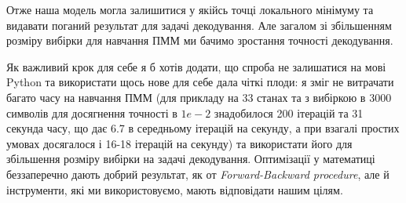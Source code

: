 \documentclass[12pt,a4paper]{article}
\begin{document}
Отже наша модель могла залишитися у якійсь точці локального мінімуму та видавати
поганий результат для задачі декодування. Але загалом зі збільшенням розміру вибірки
для навчання ПММ ми бачимо зростання точності декодування.

Як важливий крок для себе я б хотів додати, що спроба не залишатися на мові Python
та використати щось нове для себе дала чіткі плоди: я зміг не витрачати багато часу на
навчання ПММ (для прикладу на 33 станах та з вибіркою в 3000 символів для досягнення точності
в $1e-2$ знадобилося 200 ітерацій та 31 секунда часу, що дає 6.7 в середньому ітерацій на секунду,
а при взагалі простих умовах досягалося і 16-18 ітерацій на секунду) та використати його для збільшення розміру вибірки на задачі декодування.
Оптимізації у математиці беззаперечно дають добрий результат, як от
\textit{Forward-Backward procedure}, але й інструменти, які ми використовуємо, мають
відповідати нашим цілям.


\end{document}
